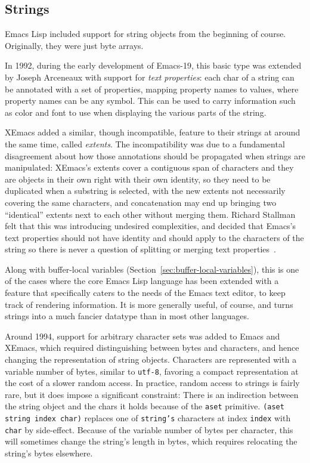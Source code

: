 \documentclass[format=acmsmall, review]{acmart}
\newcommand \Elisp {Emacs Lisp}
\begin{document}
\subsection{Strings}
\label{sec:strings}

\Elisp{} included support for string objects from the beginning of course.
Originally, they were just byte arrays.

In 1992, during the early development of Emacs-19, this basic type was
extended by Joseph Arceneaux with support for \emph{text properties}: each
char of a string can be annotated with a set of properties, mapping
property names to values, where property names can be any symbol.  This can
be used to carry information such as color and font to use when displaying
the various parts of the string.

XEmacs added a similar, though incompatible, feature to their strings at
around the same time, called \emph{extents}.  The incompatibility was due to
a fundamental disagreement about how those annotations should be propagated
when strings are manipulated: XEmacs's extents cover a contiguous span of
characters and they are objects in their own right with their own identity,
so they need to be duplicated when a substring is selected, with the new
extents not necessarily covering the same characters, and concatenation may
end up bringing two ``identical'' extents next to each other 
without merging them.  Richard Stallman felt that
this was introducing
undesired complexities, and decided that Emacs's text properties should not
have identity and should apply to the characters of the string so there is
never a question of splitting or merging text properties~\cite{RMS-text-props}.

Along with buffer-local variables
(Section~\ref{sec:buffer-local-variables}), this is one of
the cases where the core \Elisp{} language has been extended with
a feature that specifically caters to the needs of the Emacs text editor, to
keep track of rendering information.  It is more generally useful, of
course, and turns strings into a much fancier datatype than in most
other languages.

Around 1994, support for arbitrary character sets was added to Emacs and
XEmacs, which required distinguishing between bytes and characters, and
hence changing the representation of string objects.  Characters are represented with
a variable number of bytes, similar to \texttt{utf-8}, favoring a compact
representation at the cost of a slower random access.  In practice, random
access to strings is fairly rare, but it does
impose a significant constraint: There is an indirection between the string
object and the chars it holds because of the \texttt{aset} primitive.
\texttt{(aset string index char)}
replaces one of \texttt{string's} characters at index \texttt{index}
with \texttt{char} by side-effect.  Because of the variable number of bytes
per character, this will
sometimes change the string's length in bytes, which requires relocating
the string's bytes elsewhere.
\end{document}
